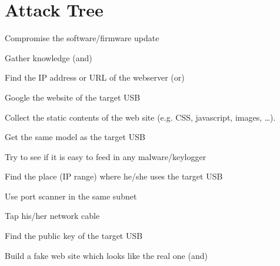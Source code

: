 \section{Attack Tree}

\begin{myEnumerate}

\item Compromise the software/firmware update
  \begin{myEnumerate}[label*=\arabic*.]
  \item Gather knowledge (and)
    \begin{myEnumerate}[label*=\arabic*.]
    \item Find the IP address or URL of the webserver (or)
      \begin{myEnumerate}[label*=\arabic*.]
      \item Google the website of the target USB
      \item Collect the static contents of the web site (e.g. CSS, javascript,
        images, \dots).
      \end{myEnumerate}
    \item Get the same model as the target USB
      \begin{myEnumerate}[label*=\arabic*.]
      \item Try to see if it is easy to feed in any malware/keylogger
      \end{myEnumerate}
    \item Find the place (IP range) where he/she uses the target USB
      \begin{myEnumerate}[label*=\arabic*.]
      \item Use port scanner in the same subnet
      \item Tap his/her network cable
      \item Find the public key of the target USB
      \end{myEnumerate}
    \end{myEnumerate}
  \item Build a fake web site which looks like the real one (and)
    \begin{myEnumerate}[label*=\arabic*.]

\end{myEnumerate}
\end{myEnumerate}
\end{myEnumerate}
